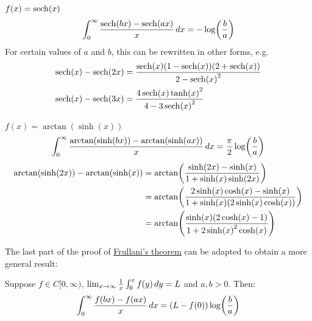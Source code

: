 \documentclass[main.tex]{subfiles}
\begin{document}
\begin{example}
    $f(x)=\sech(x)$
    \begin{equation*}
        \int_0^\infty \frac{\sech(bx)-\sech(ax)}{x}\dx = -\log(\frac{b}{a})
    \end{equation*}
    For certain values of $a$ and $b$, this can be rewritten in other forms, e.g.
    \begin{align*}
        \sech(x)-\sech(2x)
        &= \frac{\sech(x)(1-\sech(x))(2+\sech(x))}{2-\sech(x)^2} \\
        \sech(x)-\sech(3x)
        &= \frac{4\sech(x)\tanh(x)^2}{4-3\sech(x)^2}
    \end{align*}
\end{example}

\begin{example}
    $f(x)=\arctan(\sinh(x))$
    \begin{equation*}
        \int_0^\infty \frac{\arctan(\sinh(bx))-\arctan(\sinh(ax))}{x}\,dx = \frac{\pi}{2}\log(\frac{b}{a})
    \end{equation*}
    \begin{align*}
        \arctan(\sinh(2x))-\arctan(\sinh(x))
        &=\arctan(\frac{\sinh(2x)-\sinh(x)}{1+\sinh(x)\sinh(2x)}) \\
        &=\arctan(\frac{2\sinh(x)\cosh(x)-\sinh(x)}{1+\sinh(x)\qty(2\sinh(x)\cosh(x))}) \\
        &=\arctan(\frac{\sinh(x)(2\cosh(x)-1)}{1+2\sinh(x)^2\cosh(x)})
    \end{align*}
\end{example}

The last part of the proof of \hyperref[frullanis_theorem]{Frullani's theorem} can be adapted to obtain a more general result:

\begin{theorem}\label{frullanis_theorem_generalized_limit}
    Suppose $f\in C[0,\infty)$, $\lim_{x\to\infty} \frac{1}{x}\int_0^x f(y)\,dy=L$ and $a,b>0$. Then:
    \begin{equation*}
        \int_0^\infty \frac{f(bx)-f(ax)}{x}\,dx=\qty(L-f(0))\log(\frac{b}{a})
    \end{equation*}
\end{theorem}
\end{document}
